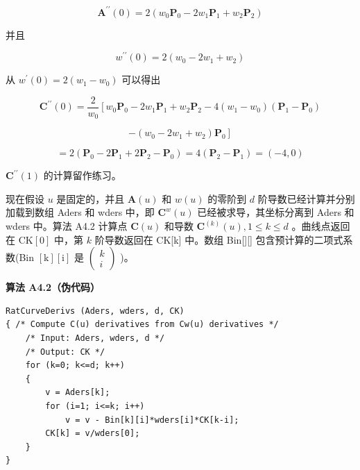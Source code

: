 \documentclass[../main.tex]{subfiles}
\begin{document}
\[
{\mathbf{A}}^{\prime \prime }\left( 0\right)  = 2\left( {{w}_{0}{\mathbf{P}}_{0} - 2{w}_{1}{\mathbf{P}}_{1} + {w}_{2}{\mathbf{P}}_{2}}\right)
\]

并且

\[
{w}^{\prime \prime }\left( 0\right)  = 2\left( {{w}_{0} - 2{w}_{1} + {w}_{2}}\right)
\]

从 \({w}^{\prime }\left( 0\right)  = 2\left( {{w}_{1} - {w}_{0}}\right)\) 可以得出

\[
{\mathbf{C}}^{\prime \prime }\left( 0\right)  = \frac{2}{{w}_{0}}\left\lbrack  {{w}_{0}{\mathbf{P}}_{0} - 2{w}_{1}{\mathbf{P}}_{1} + {w}_{2}{\mathbf{P}}_{2} - 4\left( {{w}_{1} - {w}_{0}}\right) \left( {{\mathbf{P}}_{1} - {\mathbf{P}}_{0}}\right) }\right.
\]

\[
\left. {-\left( {{w}_{0} - 2{w}_{1} + {w}_{2}}\right) {\mathbf{P}}_{0}}\right\rbrack
\]

\[
= 2\left( {{\mathbf{P}}_{0} - 2{\mathbf{P}}_{1} + 2{\mathbf{P}}_{2} - {\mathbf{P}}_{0}}\right)  = 4\left( {{\mathbf{P}}_{2} - {\mathbf{P}}_{1}}\right)  = \left( {-4,0}\right)
\]

\({\mathbf{C}}^{\prime \prime }\left( 1\right)\) 的计算留作练习。

现在假设 \(u\) 是固定的，并且 \(\mathbf{A}\left( u\right)\) 和 \(w\left( u\right)\) 的零阶到 \(d\) 阶导数已经计算并分别加载到数组 Aders 和 wders 中，即 \({\mathbf{C}}^{w}\left( u\right)\) 已经被求导，其坐标分离到 Aders 和 wders 中。算法 A4.2 计算点 \(\mathbf{C}\left( u\right)\) 和导数 \({\mathbf{C}}^{\left( k\right) }\left( u\right) ,1 \leq  k \leq  d\) 。曲线点返回在 \(\mathrm{{CK}}\left\lbrack  0\right\rbrack\) 中，第 \(k\) 阶导数返回在 CK[k] 中。数组 Bin[][] 包含预计算的二项式系数(Bin \(\left\lbrack  \mathrm{k}\right\rbrack  \left\lbrack  \mathrm{i}\right\rbrack\) 是 \(\left( \begin{array}{l} k \\  i \end{array}\right)\) )。

\par\medskip\noindent\textbf{算法 A4.2（伪代码）}\par
\begin{verbatim}
RatCurveDerivs (Aders, wders, d, CK)
{ /* Compute C(u) derivatives from Cw(u) derivatives */
    /* Input: Aders, wders, d */
    /* Output: CK */
    for (k=0; k<=d; k++)
    {
        v = Aders[k];
        for (i=1; i<=k; i++)
            v = v - Bin[k][i]*wders[i]*CK[k-i];
        CK[k] = v/wders[0];
    }
}
\end{verbatim}
\end{document}
